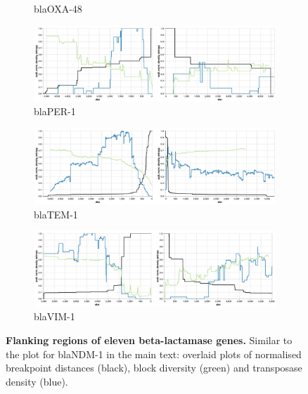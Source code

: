 \documentclass[rmp,superscriptaddress,10pt,onecolumn]{revtex4-1}
\begin{document}
\begin{figure}
\begin{subfigure}[b]{0.45\textwidth}
         \caption{blaOXA-48}
     \end{subfigure}
                    \hfill
     \begin{subfigure}[b]{0.45\textwidth}
         \centering
         \includegraphics[width=\textwidth]{figs_supp/PER-1}
         \caption{blaPER-1}
     \end{subfigure}
                    \hfill
     \begin{subfigure}[b]{0.45\textwidth}
         \centering
         \includegraphics[width=\textwidth]{figs_supp/TEM-1.png}
         \caption{blaTEM-1}
     \end{subfigure}
                    \hfill
     \begin{subfigure}[b]{0.45\textwidth}
         \centering
         \includegraphics[width=\textwidth]{figs_supp/VIM-1.png}
         \caption{blaVIM-1}
     \end{subfigure}
        \caption{\textbf{Flanking regions of eleven beta-lactamase genes.} Similar to the plot for blaNDM-1 in the main text: overlaid plots of normalised breakpoint distances (black), block diversity (green) and transposase density (blue).}
\end{figure}
\end{document}
